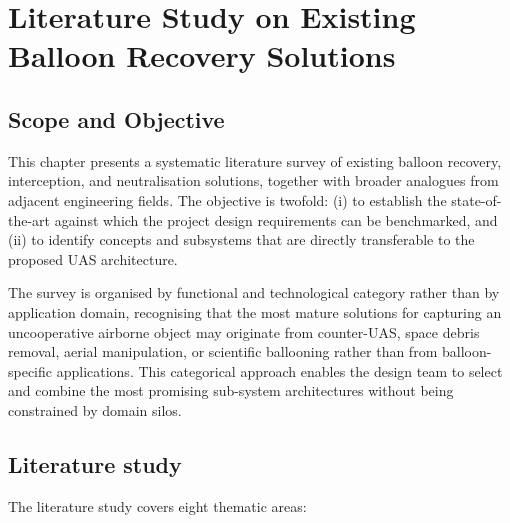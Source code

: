 

\chapter{Literature Study on Existing Balloon Recovery Solutions} \label{ch:Literature study}


\section{Scope and Objective}





This chapter presents a systematic literature survey of existing balloon recovery, interception, and neutralisation solutions, together with broader analogues from adjacent engineering fields. The objective is twofold: (i) to establish the state-of-the-art against which the project design requirements can be benchmarked, and (ii) to identify concepts and subsystems that are directly transferable to the proposed UAS architecture.


The survey is organised by functional and technological category rather than by application domain, recognising that the most mature solutions for capturing an uncooperative airborne object may originate from counter-UAS, space debris removal, aerial manipulation, or scientific ballooning rather than from balloon-specific applications. This categorical approach enables the design team to select and combine the most promising sub-system architectures without being constrained by domain silos.

\section{Literature study}

The literature study covers eight thematic areas: %

